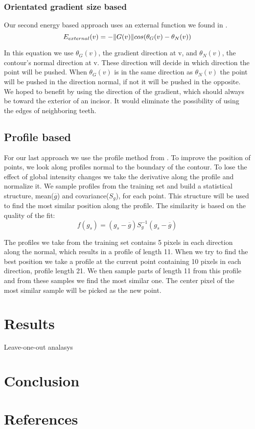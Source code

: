 \documentclass[a4paper,10pt]{article}
\begin{document}
\subsubsection{Orientated gradient size based}
Our second energy based approach uses an external function we found in \cite{OrientatedEnergy}. 
\begin{equation}
E_{external}(v) = -  \|G(v)\|cos(\theta_{G}(v) - \theta_{N}(v))\\
\end{equation}

In this equation we use $\theta_{G}(v)$, the gradient direction at v, and $\theta_{N}(v)$, the contour's normal direction at v. These direction will decide in which direction the point will be pushed. When $\theta_{G}(v)$ is in the same direction as  $\theta_{N}(v)$ the point will be pushed in the direction normal, if not it will be pushed in the opposite. We hoped to benefit by using the direction of the gradient, which should always be toward the exterior of an incisor. It would eliminate the possibility of using the edges of neighboring teeth.

\subsection{Profile based}\label{sec:fit_deriv}
For our last approach we use the profile method from \cite{TemplateAlgorithm}. To improve the position of points, we look along profiles normal to the boundary of the contour. To lose the effect of global intensity changes we take the derivative along the profile and normalize it. We sample profiles from the training set and build a statistical structure, mean($\overline{g}$) and covariance($S_{g}$), for each point. This structure will be used to find the most similar position along the profile. The similarity is based on the quality of the fit:
\begin{equation}
f(g_{s}) = (g_{s} - \overline{g}) S_{g}^{-1} (g_{s}-\overline{g})
\end{equation}

The profiles we take from the training set contains 5 pixels in each direction along the normal, which results in a profile of length 11. When we try to find the best position we take a profile at the current point containing 10 pixels in each direction, profile length 21. We then sample parts of length 11 from this profile and from these samples we find the most similar one. The center pixel of the most similar sample will be picked as the new point.

\section{Results}\label{sec:results}

\begin{table}
\begin{center}
\caption{Leave-one-out analasys}
\end{center}
\end{table}

\section{Conclusion}


\section{References}


\end{document}
